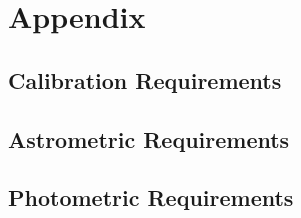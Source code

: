\section{Appendix}

\subsection{Calibration Requirements}
\subsection{Astrometric Requirements}

\subsection{Photometric Requirements}